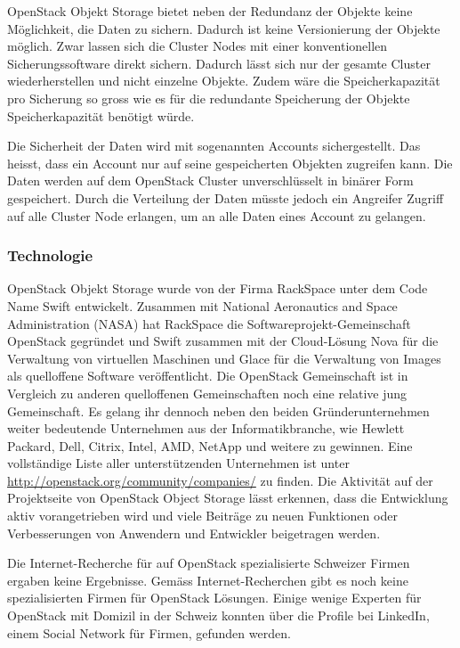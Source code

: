 OpenStack Objekt Storage bietet neben der Redundanz der Objekte keine Möglichkeit, die Daten zu sichern. Dadurch ist keine Versionierung der Objekte möglich. Zwar lassen sich die Cluster Nodes mit einer konventionellen Sicherungssoftware direkt sichern. Dadurch lässt sich nur der gesamte Cluster wiederherstellen und nicht einzelne Objekte. Zudem wäre die Speicherkapazität pro Sicherung so gross wie es für die redundante Speicherung der Objekte Speicherkapazität benötigt würde. \cite{AndyBrezinsky2011}


Die Sicherheit der Daten wird mit sogenannten Accounts sichergestellt. Das heisst, dass ein Account nur auf seine gespeicherten Objekten zugreifen kann. Die Daten werden auf dem OpenStack Cluster unverschlüsselt in binärer Form gespeichert. Durch die Verteilung der Daten müsste jedoch ein Angreifer Zugriff auf alle Cluster Node erlangen, um an alle Daten eines Account zu gelangen.

\subsubsection*{Technologie}
OpenStack Objekt Storage wurde von der Firma RackSpace unter dem Code Name Swift entwickelt. Zusammen mit National Aeronautics and Space Administration (NASA) hat RackSpace die Softwareprojekt-Gemeinschaft OpenStack gegründet und Swift zusammen mit der Cloud-Lösung Nova für die Verwaltung von virtuellen Maschinen und Glace für die Verwaltung von Images als quelloffene Software veröffentlicht. Die OpenStack Gemeinschaft ist in Vergleich zu anderen quelloffenen Gemeinschaften noch eine relative jung Gemeinschaft. Es gelang ihr dennoch neben den beiden Gründerunternehmen weiter bedeutende Unternehmen aus der Informatikbranche, wie Hewlett Packard, Dell, Citrix, Intel, AMD, NetApp und weitere zu gewinnen. Eine vollständige Liste aller unterstützenden Unternehmen ist unter \url{http://openstack.org/community/companies/} zu finden. Die Aktivität auf der Projektseite von OpenStack Object Storage lässt erkennen, dass die Entwicklung aktiv vorangetrieben wird und viele Beiträge zu neuen Funktionen oder Verbesserungen von Anwendern und Entwickler beigetragen werden. \cite{Ohloh2012}

Die Internet-Recherche für auf OpenStack spezialisierte Schweizer Firmen ergaben keine Ergebnisse. 
Gemäss Internet-Recherchen gibt es noch keine spezialisierten Firmen für OpenStack Lösungen. Einige wenige Experten für OpenStack mit Domizil in der Schweiz konnten über die Profile bei LinkedIn, einem Social Network für Firmen, gefunden werden. 

